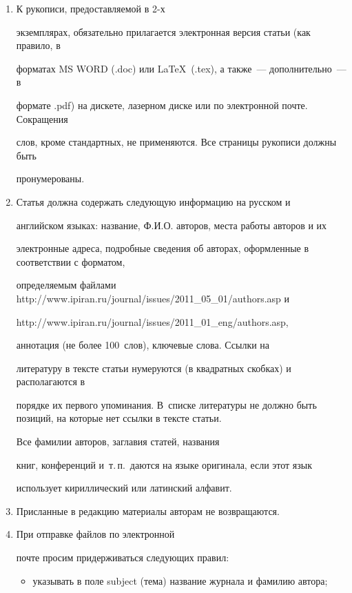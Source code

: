 {{\begin{enumerate}
\item К рукописи, предоставляемой в 2-х


экземплярах, обязательно прилагается электронная версия статьи (как правило, в


форматах MS WORD (.doc) или \LaTeX\ (.tex), а также~--- дополнительно~--- в


формате .pdf) на дискете, лазерном диске или по электронной почте. Сокращения


слов, кроме стандартных, не применяются. Все страницы рукописи должны быть


пронумерованы. %


\item Статья должна содержать следующую информацию на русском и


английском языках: название, Ф.И.О. авторов, места работы авторов и их


электронные адреса, подробные сведения об авторах, оформленные в соответствии с форматом, 


определяемым файлами {\sf http://www.ipiran.ru/journal/issues/2011\_05\_01/authors.asp} и 


{\sf http://www.ipiran.ru/journal/issues/2011\_01\_eng/authors.asp},


аннотация (не более 100~слов), ключевые слова. Ссылки на


литературу в тексте статьи нумеруются (в квадратных скобках) и располагаются в


порядке их первого упоминания. В~списке литературы не должно быть позиций, на которые нет ссылки в тексте статьи.


Все фамилии авторов, заглавия статей, названия


книг, конференций и~т.\,п.\ даются на языке оригинала, если этот язык


использует кириллический или латинский алфавит. %


\item Присланные в редакцию материалы авторам не возвращаются.


\item При отправке файлов по электронной


почте просим придерживаться следующих правил:


\begin{itemize}


\item указывать в поле subject (тема) название журнала и фамилию автора; %



\end{itemize}
\end{enumerate}}}
